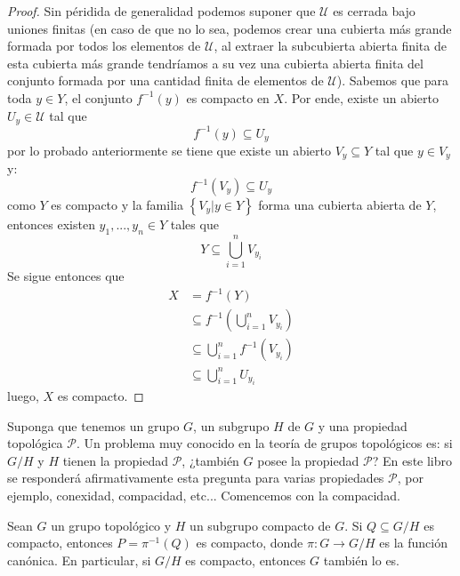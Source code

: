 \documentclass[12pt]{report}
\theoremstyle{largebreak}
\newcommand\cf[3]{\ensuremath{#1:#2\rightarrow#3}}
\begin{document}
\begin{proof}
        Sin péridida de generalidad podemos suponer que $\mathcal{U}$ es cerrada bajo uniones finitas (en caso de que no lo sea, podemos crear una cubierta más grande formada por todos los elementos de $\mathcal{U}$, al extraer la subcubierta abierta finita de esta cubierta más grande tendríamos a su vez una cubierta abierta finita del conjunto formada por una cantidad finita de elementos de $\mathcal{U}$). Sabemos que para toda $y\in Y$, el conjunto $f^{-1}(y)$ es compacto en $X$. Por ende, existe un abierto $U_y\in\mathcal{U}$ tal que
        \begin{equation*}
            f^{-1}(y)\subseteq U_y
        \end{equation*}
        por lo probado anteriormente se tiene que existe un abierto $V_y\subseteq Y$ tal que $y\in V_y$ y:
        \begin{equation*}
            f^{-1}(V_y)\subseteq U_y
        \end{equation*}
        como $Y$ es compacto y la familia $\left\{V_y\Big|y\in Y \right\}$ forma una cubierta abierta de $Y$, entonces existen $y_1,...,y_n\in Y$ tales que
        \begin{equation*}
            Y\subseteq \bigcup_{ i=1}^n V_{ y_i} 
        \end{equation*}
        Se sigue entonces que
        \begin{equation*}
            \begin{split}
                X&=f^{-1}(Y)\\
                &\subseteq f^{-1}\left(\bigcup_{ i=1}^n V_{ y_i} \right)\\
                &\subseteq\bigcup_{ i=1}^n f^{-1}(V_{ y_i})\\
                &\subseteq\bigcup_{ i=1}^n U_{ y_i}
            \end{split}
        \end{equation*}
        luego, $X$ es compacto.
    \end{proof}

    Suponga que tenemos un grupo $G$, un subgrupo $H$ de $G$ y una propiedad topológica $\mathcal{P}$. Un problema muy conocido en la teoría de grupos topológicos es: si $G/H$ y $H$ tienen la propiedad $\mathcal{P}$, ¿también $G$ posee la propiedad $\mathcal{P}$? En este libro se responderá afirmativamente esta pregunta para varias propiedades $\mathcal{P}$, por ejemplo, conexidad, compacidad, etc... Comencemos con la compacidad.

    \begin{theor}
        Sean $G$ un grupo topológico y $H$ un subgrupo compacto de $G$. Si $Q\subseteq G/H$ es compacto, entonces $P=\pi^{-1}(Q)$ es compacto, donde $\cf{\pi}{G}{G/H}$ es la función canónica. En particular, si $G/H$ es compacto, entonces $G$ también lo es.
    \end{theor}
\end{document}
